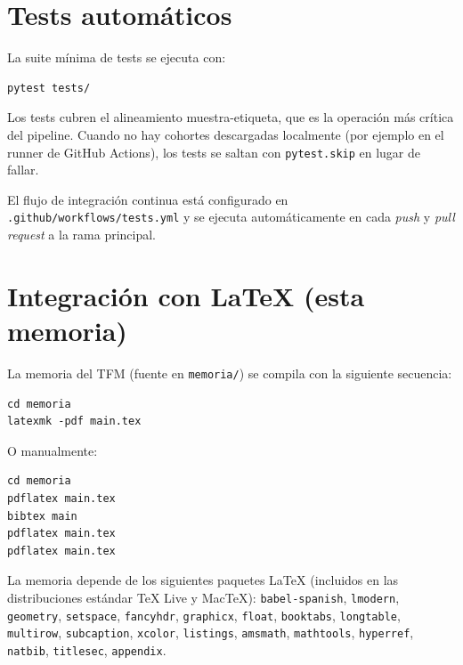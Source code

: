\section*{Tests automáticos}
{}

La suite mínima de tests se ejecuta con:

\begin{lstlisting}[style=bash]
pytest tests/
\end{lstlisting}

Los tests cubren el alineamiento muestra-etiqueta, que es la operación
más crítica del pipeline. Cuando no hay cohortes descargadas localmente
(por ejemplo en el runner de GitHub Actions), los tests se saltan con
\texttt{pytest.skip} en lugar de fallar.

El flujo de integración continua está configurado en
\texttt{.github/workflows/tests.yml} y se ejecuta automáticamente en
cada \emph{push} y \emph{pull request} a la rama principal.

\section*{Integración con LaTeX (esta memoria)}
{}

La memoria del TFM (fuente en \texttt{memoria/}) se compila con la
siguiente secuencia:

\begin{lstlisting}[style=bash, caption={Compilación de la memoria.}]
cd memoria
latexmk -pdf main.tex
\end{lstlisting}

O manualmente:

\begin{lstlisting}[style=bash]
cd memoria
pdflatex main.tex
bibtex main
pdflatex main.tex
pdflatex main.tex
\end{lstlisting}

La memoria depende de los siguientes paquetes LaTeX (incluidos en las
distribuciones estándar TeX Live y MacTeX):
\texttt{babel-spanish}, \texttt{lmodern}, \texttt{geometry},
\texttt{setspace}, \texttt{fancyhdr}, \texttt{graphicx}, \texttt{float},
\texttt{booktabs}, \texttt{longtable}, \texttt{multirow},
\texttt{subcaption}, \texttt{xcolor}, \texttt{listings},
\texttt{amsmath}, \texttt{mathtools}, \texttt{hyperref},
\texttt{natbib}, \texttt{titlesec}, \texttt{appendix}.

